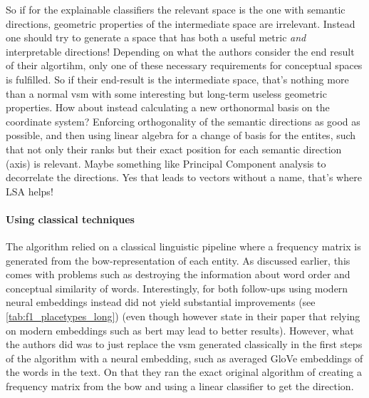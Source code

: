 So if for the explainable classifiers the relevant space is the one with semantic directions, geometric properties of the intermediate space are irrelevant. Instead one should try to generate a space that has both a useful metric \textit{and} interpretable directions! Depending on what the authors consider the end result of their algortihm, only one of these necessary requirements for conceptual spaces is fulfilled. So if their end-result is the intermediate space, that's nothing more than a normal \gls{vsm} with some interesting but long-term useless geometric properties. How about instead calculating a new orthonormal basis on the coordinate system? Enforcing orthogonality of the semantic directions as good as possible, and then using linear algebra for a change of basis for the entites, such that not only their ranks but their exact position for each semantic direction (axis) is relevant.  Maybe something like Principal Component analysis to decorrelate the directions. Yes that leads to vectors without a name, that's where LSA helps!



\paragraph{Using classical techniques}

The algorithm relied on a classical linguistic pipeline where a frequency matrix is generated from the \gls{bow}-representation of each entity. As discussed earlier, this comes with problems such as destroying the information about word order and conceptual similarity of words. Interestingly, for both follow-ups \cite{Ager2018,Alshaikh2020} using modern neural embeddings instead did not yield substantial improvements (see \autoref{tab:f1_placetypes_long}) (even though however \cite{Alshaikh2020} state in their paper that relying on modern embeddings such as \gls{bert} \cite{Devlin2019} may lead to better results). However, what the authors did was to just replace the \gls{vsm} generated classically in the first steps of the algorithm with a neural embedding, such as averaged GloVe embeddings \cite{pennington2014glove} of the words in the text. On that they ran the exact original algorithm of creating a frequency matrix from the \gls{bow} and using a linear classifier to get the direction. 

